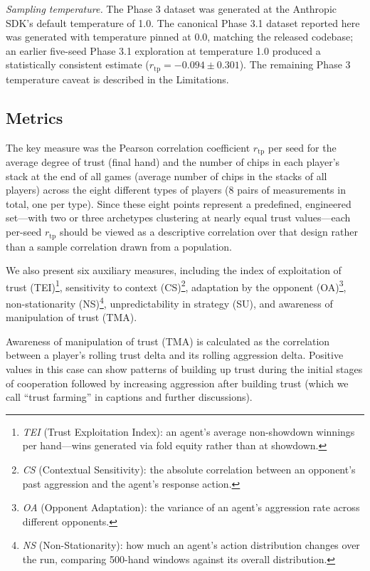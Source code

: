 \documentclass[10pt,twocolumn,letterpaper]{article}
\newcommand{\rtp}{\ensuremath{r_{\mathrm{tp}}}}
\begin{document}
\textit{Sampling temperature.} The Phase 3 dataset was generated at the Anthropic SDK's default temperature of 1.0. The canonical Phase 3.1 dataset reported here was generated with temperature pinned at 0.0, matching the released codebase; an earlier five-seed Phase 3.1 exploration at temperature 1.0 produced a statistically consistent estimate ($\rtp = -0.094 \pm 0.301$). The remaining Phase 3 temperature caveat is described in the Limitations.

\subsection{Metrics}
The key measure was the Pearson correlation coefficient $\rtp$ per
seed for the average degree of trust (final hand) and the number of
chips in each player's stack at the end of all games (average number
of chips in the stacks of all players) across the eight different
types of players (8 pairs of measurements in total, one per type).
Since these eight points represent a predefined, engineered
set---with two or three archetypes clustering at nearly equal trust
values---each per-seed $\rtp$ should be viewed as a descriptive
correlation over that design rather than a sample correlation drawn
from a population.

We also present six auxiliary measures, including the index of
exploitation of trust (TEI)\footnote{\textit{TEI} (Trust Exploitation Index): an agent's average
non-showdown winnings per hand---wins generated via fold equity
rather than at showdown.},
sensitivity to context (CS)\footnote{\textit{CS} (Contextual Sensitivity): the absolute correlation
between an opponent's past aggression and the agent's response
action.}, adaptation by the opponent
(OA)\footnote{\textit{OA} (Opponent Adaptation): the variance of an agent's
aggression rate across different opponents.},
non-stationarity (NS)\footnote{\textit{NS} (Non-Stationarity): how much an agent's action
distribution changes over the run, comparing 500-hand windows against
its overall distribution.},
unpredictability in strategy (SU), and awareness of manipulation of
trust (TMA).

Awareness of manipulation of trust (TMA) is calculated as the
correlation between a player's rolling trust delta and its rolling
aggression delta. Positive values in this case can show patterns of
building up trust during the initial stages of cooperation followed
by increasing aggression after building trust (which we call ``trust
farming'' in captions and further discussions).
\end{document}
